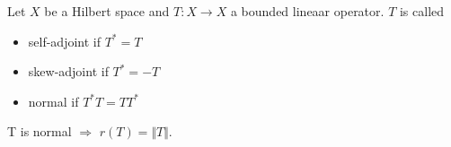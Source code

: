 \documentclass[../../note.tex]{subfiles}
\begin{document}
\begin{definition}
    Let $X$ be a Hilbert space and $T: X \rightarrow X$ a bounded lineaar operator. $T$ is called 
    \begin{itemize}
        \item self-adjoint if $T^\ast = T$ 
        \item skew-adjoint if $T^\ast = -T$
        \item normal if $T^\ast T = T T^\ast$
    \end{itemize}
\end{definition}

\begin{proposition}
    T is normal $\Longrightarrow$ $r(T) = \Vert T \Vert$.
\end{proposition}
\end{document}
